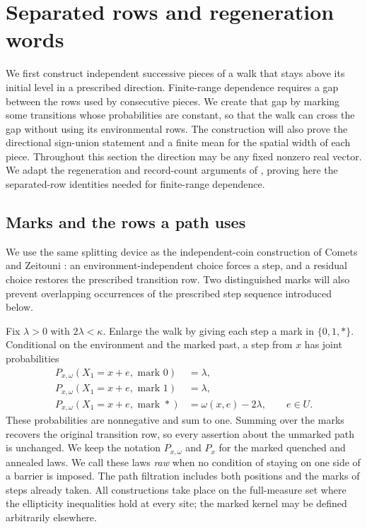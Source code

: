 \section{Separated rows and regeneration words}\label{sec:cuts}

We first construct independent successive pieces of a walk that stays
above its initial level in a prescribed direction.  Finite-range dependence requires a
gap between the rows used by consecutive pieces.  We create that gap by
marking some transitions whose probabilities are constant, so that the
walk can cross the gap without using its environmental rows.  The
construction will also prove the directional sign-union statement and a
finite mean for the spatial width of each piece.  Throughout this section
the direction may be any fixed nonzero real vector.  We adapt the
regeneration and record-count arguments of
\cite[Section~2]{OpenAI2026}, proving here the separated-row identities
needed for finite-range dependence.

\subsection{Marks and the rows a path uses}

We use the same splitting device as the independent-coin construction
of Comets and Zeitouni \cite[Equation~(2.1)]{CometsZeitouni2004}:
an environment-independent choice forces a step, and a residual choice
restores the prescribed transition row.  Two distinguished marks will
also prevent overlapping occurrences of the prescribed step sequence
introduced below.

Fix \(\lambda>0\) with \(2\lambda<\kappa\).  Enlarge the walk by giving
each step a mark in \(\{0,1,*\}\).  Conditional on the environment and
the marked past, a step from \(x\) has joint probabilities
\begin{equation}\label{eq:marked-kernel}
 \begin{aligned}
 P_{x,\omega}(X_1=x+e,\text{ mark }0)&=\lambda,\\
 P_{x,\omega}(X_1=x+e,\text{ mark }1)&=\lambda,\\
 P_{x,\omega}(X_1=x+e,\text{ mark }*)&=\omega(x,e)-2\lambda,
 \qquad e\in U.
 \end{aligned}
\end{equation}
These probabilities are nonnegative and sum to one.  Summing over the
marks recovers the original transition row, so every assertion about
the unmarked path is unchanged.  We keep the notation
\(P_{x,\omega}\) and \(P_x\) for the marked quenched and annealed laws.
We call these laws \emph{raw} when no condition of staying on one side of
a barrier is imposed.  The path filtration includes both positions and
the marks of steps already taken.  All constructions take place on the
full-measure set where the ellipticity inequalities hold at every site;
the marked kernel may be defined arbitrarily elsewhere.

